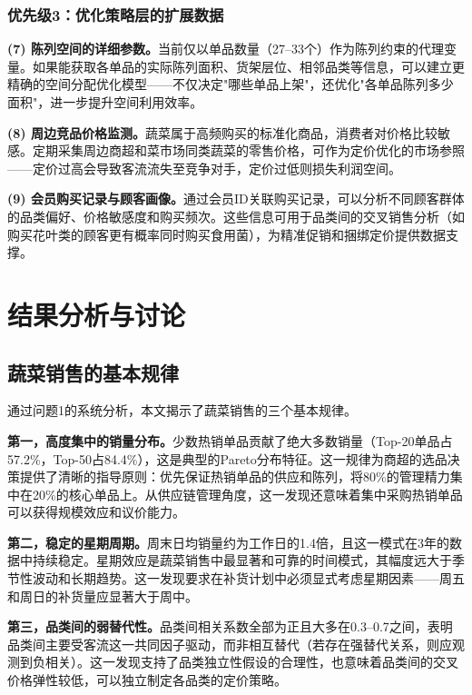 \documentclass[12pt,a4paper]{ctexart}
\begin{document}
\subsubsection{优先级3：优化策略层的扩展数据}

\textbf{(7) 陈列空间的详细参数。}当前仅以单品数量（27--33个）作为陈列约束的代理变量。如果能获取各单品的实际陈列面积、货架层位、相邻品类等信息，可以建立更精确的空间分配优化模型——不仅决定"哪些单品上架"，还优化"各单品陈列多少面积"，进一步提升空间利用效率。

\textbf{(8) 周边竞品价格监测。}蔬菜属于高频购买的标准化商品，消费者对价格比较敏感。定期采集周边商超和菜市场同类蔬菜的零售价格，可作为定价优化的市场参照——定价过高会导致客流流失至竞争对手，定价过低则损失利润空间。

\textbf{(9) 会员购买记录与顾客画像。}通过会员ID关联购买记录，可以分析不同顾客群体的品类偏好、价格敏感度和购买频次。这些信息可用于品类间的交叉销售分析（如购买花叶类的顾客更有概率同时购买食用菌），为精准促销和捆绑定价提供数据支撑。

\section{结果分析与讨论}

\subsection{蔬菜销售的基本规律}

通过问题1的系统分析，本文揭示了蔬菜销售的三个基本规律。

\textbf{第一，高度集中的销量分布。}少数热销单品贡献了绝大多数销量（Top-20单品占57.2\%，Top-50占84.4\%），这是典型的Pareto分布特征。这一规律为商超的选品决策提供了清晰的指导原则：优先保证热销单品的供应和陈列，将80\%的管理精力集中在20\%的核心单品上。从供应链管理角度，这一发现还意味着集中采购热销单品可以获得规模效应和议价能力。

\textbf{第二，稳定的星期周期。}周末日均销量约为工作日的1.4倍，且这一模式在3年的数据中持续稳定。星期效应是蔬菜销售中最显著和可靠的时间模式，其幅度远大于季节性波动和长期趋势。这一发现要求在补货计划中必须显式考虑星期因素——周五和周日的补货量应显著大于周中。

\textbf{第三，品类间的弱替代性。}品类间相关系数全部为正且大多在0.3--0.7之间，表明品类间主要受客流这一共同因子驱动，而非相互替代（若存在强替代关系，则应观测到负相关）。这一发现支持了品类独立性假设的合理性，也意味着品类间的交叉价格弹性较低，可以独立制定各品类的定价策略。
\end{document}
